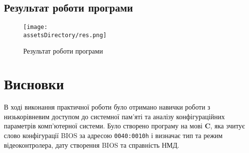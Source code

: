 \subsection{Результат роботи програми}
\begin{figure}[ht!]
    \centering
    \texttt{[image: \\assetsDirectory/res.png]}
    \caption{Результат роботи програми}
\end{figure}

\clearpage
\section{Висновки}
В ході виконання практичної роботи було отримано навички роботи з
низькорівневим доступом до системної пам'яті та аналізу конфігураційних параметрів комп'ютерної системи.
Було створено програму на мові \textbf{C}, яка зчитує слово конфігурації BIOS за адресою \texttt{0040:0010h}
і визначає тип та режим відеоконтролера, дату створення BIOS та справність НМД.

